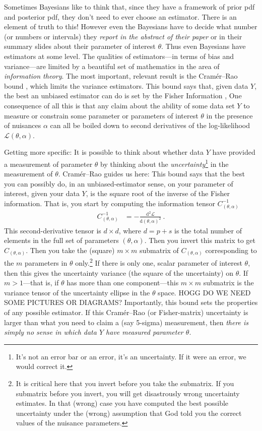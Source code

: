 \documentclass{article}
\newcommand{\dd}{\mathrm{d}}
\begin{document}
Sometimes Bayesians like to think that, since they have a framework of prior pdf and posterior pdf, they don't need to ever choose an estimator.
There is an element of truth to this!
However even the Bayesians have to decide what number (or numbers or intervals) they \emph{report in the abstract of their paper} or in their summary slides about their parameter of interest $\theta$.
Thus even Bayesians have estimators at some level.
The qualities of estimators---in terms of bias and variance---are limited by a beautiful set of mathematics in the area of \emph{information theory}.
The most important, relevant result is the Cram\'er--Rao bound \cite{cramer, rao}, which limits the variance estimators.
This bound says that, given data $Y$, the best an unbiased estimator can do is set by the Fisher Information \cite{fisher},
One consequence of all this is that any claim about the ability of some data set $Y$ to measure or constrain some parameter or parameters of interest $\theta$ in the presence of nuisances $\alpha$ can all be boiled down to second derivatives of the log-likelihood $\mathscr{L}(\theta,\alpha)$.

Getting more specific:
It is possible to think about whether data $Y$ have provided a measurement of parameter $\theta$ by thinking about the \emph{uncertainty}\footnote{%
It's not an error bar or an error, it's an uncertainty. If it were an error, we would correct it.}
in the measurement of $\theta$.
Cram\'er--Rao guides us here:
This bound says that the best you can possibly do, in an unbiased-estimator sense, on your parameter of interest, given your data $Y$, is the square root of the inverse of the Fisher information.
That is, you start by computing the information tensor $C^{-1}_{(\theta,\alpha)}$
\begin{align}
    C^{-1}_{(\theta,\alpha)} &= - \frac{\dd^2\mathscr{L}}{\dd(\theta,\alpha)^2} ~.\label{eq:fisher}
\end{align}
This second-derivative tensor is $d\times d$, where $d=p+s$ is the total number of elements in the full set of parameters $(\theta,\alpha)$.
Then you invert this matrix to get $C_{(\theta,\alpha)}$.
Then you take the (square) $m\times m$ submatrix of $C_{(\theta,\alpha)}$ corresponding to the $m$ parameters in $\theta$ only.\footnote{It is critical here that you invert before you take the submatrix. If you submatrix before you invert, you will get disastrously wrong uncertainty estimates. In that (wrong) case you have computed the best possible uncertainty under the (wrong) assumption that God told you the correct values of the nuisance parameters.}
If there is only one, scalar parameter of interest $\theta$, then this gives the uncertainty variance (the square of the uncertainty) on $\theta$.
If $m>1$---that is, if $\theta$ has more than one component---this $m\times m$ submatrix is the variance tensor of the uncertainty ellipse in the $\theta$ space.
HOGG DO WE NEED SOME PICTURES OR DIAGRAMS?
Importantly, this bound sets the properties of any possible estimator.
If this Cram\'er--Rao (or Fisher-matrix) uncertainty is larger than what you need to claim a (say 5-sigma) measurement, then \emph{there is simply no sense in which data $Y$ have measured parameter $\theta$}.
\end{document}
